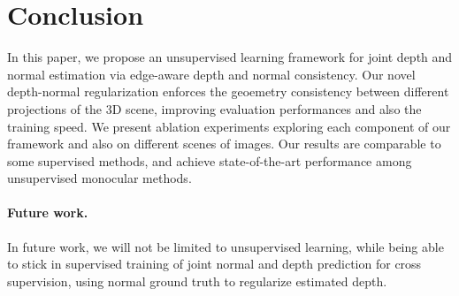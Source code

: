 \section{Conclusion} 
In this paper, we propose an unsupervised learning framework for joint depth and normal estimation via edge-aware depth and normal consistency. Our novel depth-normal regularization enforces the geoemetry consistency between different projections of the 3D scene, improving evaluation performances and also the training speed.
We present ablation experiments exploring each component of our framework and also on different scenes of images. Our results are comparable to some supervised methods, and achieve state-of-the-art performance among unsupervised monocular methods.

\paragraph{Future work.}
In future work, we will not be limited to unsupervised learning, while being able to stick in supervised training of joint normal and depth prediction for cross supervision, \eg using normal ground truth to regularize estimated depth.
